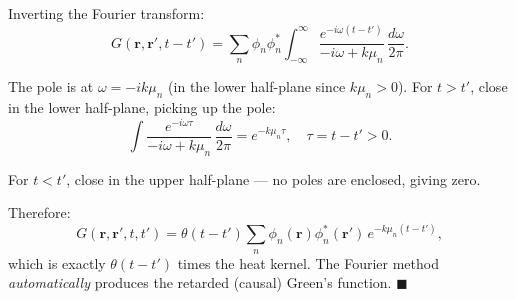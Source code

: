 \documentclass[12pt]{article}
\begin{document}
Inverting the Fourier transform:
\[
G(\mathbf{r},\mathbf{r}',t-t') = \sum_n \phi_n\phi_n^*\int_{-\infty}^{\infty}\frac{e^{-i\omega(t-t')}}{-i\omega + k\mu_n}\,\frac{d\omega}{2\pi}.
\]

The pole is at $\omega = -ik\mu_n$ (in the lower half-plane since $k\mu_n > 0$). For $t > t'$, close in the lower half-plane, picking up the pole:
\[
\int\frac{e^{-i\omega\tau}}{-i\omega + k\mu_n}\,\frac{d\omega}{2\pi} = e^{-k\mu_n\tau}, \quad \tau = t - t' > 0.
\]

For $t < t'$, close in the upper half-plane --- no poles are enclosed, giving zero.

Therefore:
\[
G(\mathbf{r},\mathbf{r}',t,t') = \theta(t-t')\sum_n \phi_n(\mathbf{r})\phi_n^*(\mathbf{r}')\,e^{-k\mu_n(t-t')},
\]
which is exactly $\theta(t-t')$ times the heat kernel. The Fourier method \textit{automatically} produces the retarded (causal) Green's function. $\blacksquare$
\end{document}
